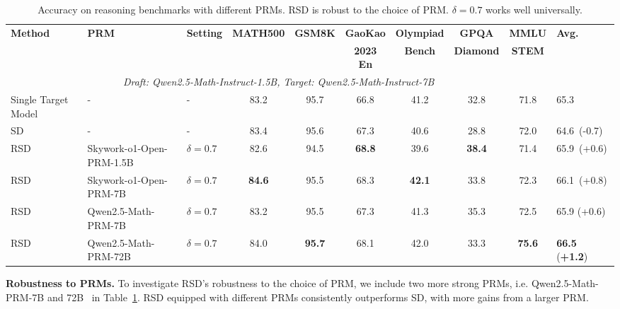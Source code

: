 \documentclass{article}
\theoremstyle{plain}
\theoremstyle{definition}
\theoremstyle{remark}
\begin{document}
\begin{table}[t]
\caption{Accuracy on reasoning benchmarks with different PRMs. RSD is robust to the choice of PRM. $\delta=0.7$ works well universally.}
\label{tab:more_prms}
\vskip 0.1in
\scriptsize
\begin{center}
\begin{tabular}{lllccccccl}
\toprule
\multirow{2}{*}{\textbf{Method}} & \multirow{2}{*}{\textbf{PRM}} & \multirow{2}{*}{\textbf{Setting}} & \multirow{2}{*}{\textbf{MATH500}} & \multirow{2}{*}{\textbf{GSM8K}} & \textbf{GaoKao} &  \textbf{Olympiad} &  \textbf{GPQA} &  \textbf{MMLU} & \multirow{2}{*}{\textbf{Avg.}} \\
 & & & & & \textbf{2023 En} &  \textbf{Bench} &  \textbf{Diamond} &  \textbf{STEM} \\
\midrule
\multicolumn{9}{c}{\textit{Draft: Qwen2.5-Math-Instruct-1.5B, Target: Qwen2.5-Math-Instruct-7B}} \\
\midrule
Single Target Model  & - & - & 83.2 & 95.7 & 66.8 & 41.2 & 32.8 & 71.8 & 65.3 \\
\cmidrule(lr){1-10}
SD &  - & - & 83.4 & 95.6 & 67.3 & 40.6 & 28.8 & 72.0 & 64.6~(-0.7) \\
\rowcolor{blue!8}
RSD & Skywork-o1-Open-PRM-1.5B & $\delta=0.7$ & 82.6 & 94.5 & \textbf{68.8} & 39.6 & \textbf{38.4} & 71.4 & 65.9~(+0.6) \\
\rowcolor{blue!8}
RSD & Skywork-o1-Open-PRM-7B & $\delta=0.7$ & \textbf{84.6} & 95.5 & 68.3 & \textbf{42.1} & 33.8 & 72.3 & 66.1~(+0.8) \\
\rowcolor{blue!8}
RSD & Qwen2.5-Math-PRM-7B & $\delta=0.7$ & 83.2 & 95.5 & 67.3 & 41.3 & 35.3 & 72.5 & 65.9 (+0.6) \\
\rowcolor{blue!8}
RSD & Qwen2.5-Math-PRM-72B & $\delta=0.7$ & 84.0 & \textbf{95.7} & 68.1 & 42.0 & 33.3 & \textbf{75.6} & \textbf{66.5} (\textbf{+1.2}) \\
\bottomrule
\end{tabular}
\end{center}
\vskip -0.2in
\end{table}

\textbf{Robustness to PRMs.} To investigate RSD's robustness to the choice of PRM, we include two more strong PRMs, i.e. Qwen2.5-Math-PRM-7B and 72B~\citep{zhang2025lessons} in Table~\ref{tab:more_prms}. RSD equipped with different PRMs consistently outperforms SD, with more gains from a larger PRM.
\end{document}

